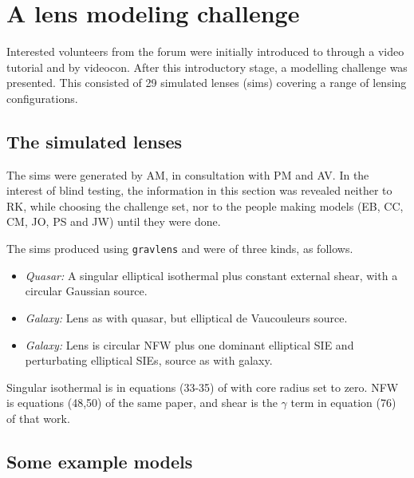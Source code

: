 \section{A lens modeling challenge} \label{sec:mod_challenge}


Interested volunteers from the \sw forum were initially introduced to
\spl through a video tutorial and by videocon.  After this
introductory stage, a modelling challenge was presented.  This
consisted of 29 simulated lenses (sims) covering a range of lensing
configurations.

\subsection{The simulated lenses} \label{sec:sims}

The sims were generated by AM, in consultation with PM and AV.  In the
interest of blind testing, the information in this section was
revealed neither to RK, while choosing the challenge set, nor to the
people making models (EB, CC, CM, JO, PS and JW) until they were done.

The sims produced using {\tt gravlens}
\citep{2001astro.ph..2341K,2001astro.ph..2340K} and were of three
kinds, as follows.

\begin{itemize}
  \item {\em Quasar:\/} A singular elliptical isothermal plus constant
    external shear, with a circular Gaussian source.
  \item {\em Galaxy:\/} Lens as with quasar, but elliptical de
    Vaucouleurs source.
  \item {\em Galaxy:\/} Lens is circular NFW plus one dominant
    elliptical SIE and perturbating elliptical SIEs, source as with
    galaxy.
\end{itemize}

Singular isothermal is in equations (33-35) of
\cite{2001astro.ph..2341K} with core radius set to zero. NFW is
equations (48,50) of the same paper, and shear is the $\gamma$ term in
equation (76) of that work.

\subsection{Some example models} \label{sec:example_models}

